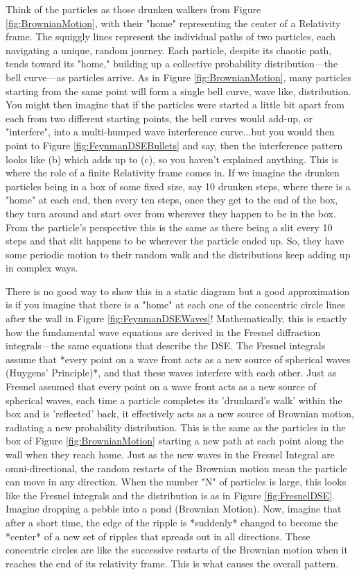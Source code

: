 \documentclass{article}
\begin{document}
Think of the particles as those drunken walkers from Figure \ref{fig:BrownianMotion}, with their "home" representing the center of a Relativity frame. The squiggly lines represent the individual paths of two particles, each navigating a unique, random journey. Each particle, despite its chaotic path, tends toward its "home," building up a collective probability distribution—the bell curve—as particles arrive. As in Figure \ref{fig:BrownianMotion}, many particles starting from the same point will form a single bell curve, wave like, distribution. You might then imagine that if the particles were started a little bit apart from each from two different starting points, the bell curves would add-up, or "interfere", into a multi-humped wave interference curve...but you would then point to Figure \ref{fig:FeynmanDSEBullets} and say, then the interference pattern looks like (b) which adds up to (c), so you haven't explained anything. This is where the role of a finite Relativity frame comes in. If we imagine the drunken particles being in a box of some fixed size, say 10 drunken steps, where there is a "home" at each end, then every ten steps, once they get to the end of the box, they turn around and start over from wherever they happen to be in the box. From the particle's perspective this is the same as there being a slit every 10 steps and that slit happens to be wherever the particle ended up. So, they have some periodic motion to their random walk and the distributions keep adding up in complex ways.

There is no good way to show this in a static diagram but a good approximation is if you imagine that there is a "home" at each one of the concentric circle lines after the wall in Figure \ref{fig:FeynmanDSEWaves}! Mathematically, this is exactly how the fundamental wave equations are derived in the Fresnel diffraction integrals—the same equations that describe the DSE. The Fresnel integrals assume that *every point on a wave front acts as a new source of spherical waves (Huygens' Principle)*, and that these waves interfere with each other. Just as Fresnel assumed that every point on a wave front acts as a new source of spherical waves, each time a particle completes its 'drunkard's walk' within the box and is 'reflected' back, it effectively acts as a new source of Brownian motion, radiating a new probability distribution. This is the same as the particles in the box of Figure \ref{fig:BrownianMotion} starting a new path at each point along the wall when they reach home. Just as the new waves in the Fresnel Integral are omni-directional, the random restarts of the Brownian motion mean the particle can move in any direction. When the number "N" of particles is large, this looks like the Fresnel integrals and the distribution is as in Figure \ref{fig:FresnelDSE}. Imagine dropping a pebble into a pond (Brownian Motion). Now, imagine that after a short time, the edge of the ripple is *suddenly* changed to become the *center* of a new set of ripples that spreads out in all directions. These concentric circles are like the successive restarts of the Brownian motion when it reaches the end of its relativity frame. This is what causes the overall pattern.
\end{document}
